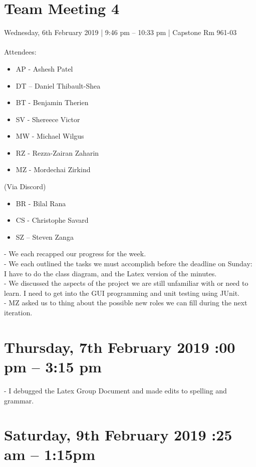 \documentclass[12pt]{article}
\begin{document}
\section{Team Meeting 4 }
Wednesday, 6th February 2019 | 9:46 pm – 10:33 pm | Capstone Rm 961-03\\\\
Attendees: \\
\begin{itemize}
	\item AP - Ashesh Patel
	\item DT – Daniel Thibault-Shea
	\item BT - Benjamin Therien
	\item SV - Shereece Victor
	\item MW - Michael Wilgus
	\item RZ - Rezza-Zairan Zaharin
	\item MZ - Mordechai Zirkind
\end{itemize}

(Via Discord)
\begin{itemize}
	\item BR - Bilal Rana
	\item CS - Christophe Savard
	\item SZ – Steven Zanga
\end{itemize}

-	We each recapped our progress for the week. \\
-	We each outlined the tasks we must accomplish before the deadline on Sunday: I have to do the class diagram, and the Latex version of the minutes. \\
-	We discussed the aspects of the project we are still unfamiliar with or need to learn. I need to get into the GUI programming and unit testing using JUnit. \\
-	MZ asked us to thing about the possible new roles we can fill during the next iteration. \\
\pagebreak

\section{Thursday, 7th February 2019 :00 pm – 3:15 pm}
 
-	I debugged the Latex Group Document and made edits to spelling and grammar.\\ 

\section{Saturday, 9th February 2019 :25 am – 1:15pm }
\end{document}

